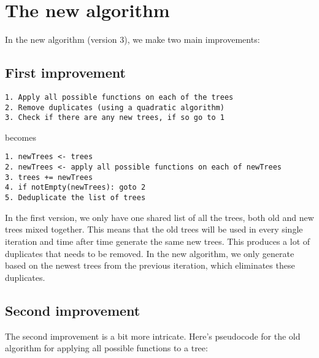 \chapter{The new algorithm}


In the new algorithm (version 3), we make two main improvements:

\section{First improvement}

\begin{verbatim}
1. Apply all possible functions on each of the trees
2. Remove duplicates (using a quadratic algorithm)
3. Check if there are any new trees, if so go to 1
\end{verbatim}

becomes

\begin{verbatim}
1. newTrees <- trees
2. newTrees <- apply all possible functions on each of newTrees
3. trees += newTrees
4. if notEmpty(newTrees): goto 2
5. Deduplicate the list of trees
\end{verbatim}

In the first version, we only have one shared list of all the trees, both old and new trees mixed together. This means that the old trees will be used in every single iteration and time after time generate the same new trees. This produces a lot of duplicates that needs to be removed. In the new algorithm, we only generate based on the newest trees from the previous iteration, which eliminates these duplicates.



\section{Second improvement}

The second improvement is a bit more intricate. Here's pseudocode for the old algorithm for applying all possible functions to a tree:

